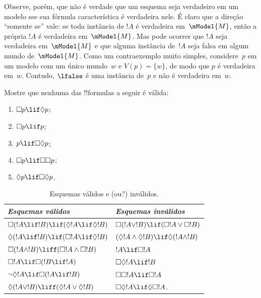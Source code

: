 \documentclass[../../../include/open-logic-section]{subfiles}
\begin{document}
Observe, porém, que não é verdade que um esquema seja verdadeiro em um
modelo sse sua fórmula característica é verdadeira nele. É claro que a
direção ``somente se'' vale: se toda instância de $!A$ é verdadeira
em~$\mModel{M}$, então a própria $!A$ é verdadeira em~$\mModel{M}$. Mas
pode ocorrer que $!A$ seja verdadeira em~$\mModel{M}$ e que alguma
instância de~$!A$ seja falsa em algum mundo de~$\mModel{M}$. Como um
contraexemplo muito simples, considere~$p$ em um modelo com um único
mundo~$w$ e $V(p) = \{w\}$, de modo que $p$ é verdadeira em~$w$.
Contudo, $\lfalse$ é uma instância de~$p$ e não é verdadeira em~$w$.

\begin{prob}
  Mostre que nenhuma das !!{formula}s a seguir é válida:
  \begin{enumerate}
    \item[\Ax{D}:] \quad $\Box p \lif \Diamond p$;
    \item[\Ax{T}:] \quad $\Box p \lif p$;
    \item[\Ax{B}:] \quad $p \lif \Box\Diamond p$;
    \item[\Ax{4}:] \quad $\Box p \lif \Box \Box p$;
    \item[\Ax{5}:] \quad $\Diamond p \lif \Box \Diamond
      p$.
  \end{enumerate}
\end{prob}

\begin{table}[t]
    \centering
    \begin{tabular}{| l || l |}
      \hline
      {\emph{Esquemas válidos}} & {\emph{Esquemas inválidos}} \\
      \hline\hline
      $\Box(!A \lif !B) \lif (\Diamond !A \lif \Diamond !B)$
      & $\Box (!A \lor !B) \lif (\Box !A \lor \Box !B)$ \\
      $\Diamond (!A \lif !B) \lif (\Box !A \lif \Diamond
      !B)$
      & $(\Diamond !A \land \Diamond !B) \lif \Diamond (!A
      \land !B)$\\
      $\Box (!A \land !B) \liff (\Box !A \land \Box !B)$
      & $!A \lif \Box !A$ \\
      $\Box !A \lif \Box (!B \lif !A)$
      & $\Box \Diamond !A \lif !B$ \\
      $\lnot \Diamond !A \lif \Box (!A \lif !B)$
      & $\Box \Box !A \lif \Box !A$ \\
      $\Diamond (!A \lor !B) \liff (\Diamond !A \lor
      \Diamond !B)$
      & $\Box \Diamond !A \lif \Diamond \Box !A$. \\
      \hline
    \end{tabular}
    \caption{Esquemas válidos e (ou?) inválidos.}
\end{table}
\end{document}
